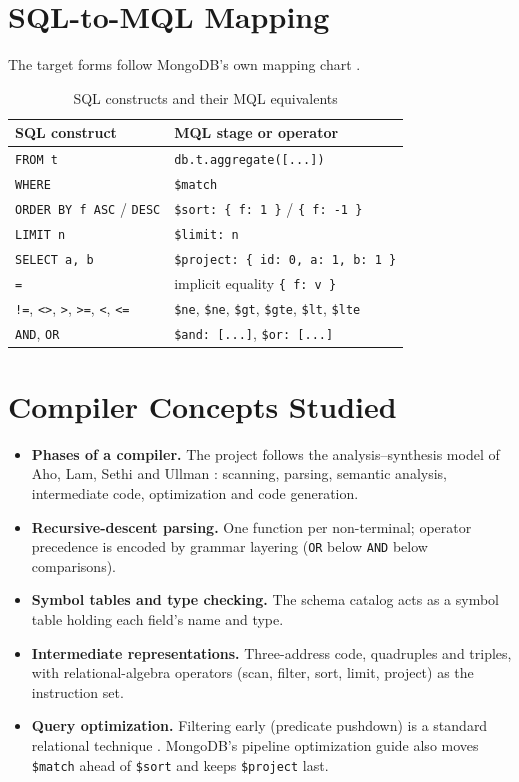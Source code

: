 \documentclass[12pt,a4paper]{report}
\newcommand{\codeus}{\textunderscore\allowbreak}
\DeclareRobustCommand{\code}[1]{\texttt{\let\_\codeus #1}}
\begin{document}
\section{SQL-to-MQL Mapping}
The target forms follow MongoDB's own mapping chart \cite{mongo-chart}.
\begin{table}[H]
\centering\small
\begin{tabular}{|l|l|}
\hline
\textbf{SQL construct} & \textbf{MQL stage or operator} \\ \hline
\code{FROM t} & \code{db.t.aggregate([...])} \\ \hline
\code{WHERE} & \code{\$match} \\ \hline
\code{ORDER BY f ASC} / \code{DESC} & \code{\$sort: \{ f: 1 \}} / \code{\{ f: -1 \}} \\ \hline
\code{LIMIT n} & \code{\$limit: n} \\ \hline
\code{SELECT a, b} & \code{\$project: \{ \_id: 0, a: 1, b: 1 \}} \\ \hline
\code{=} & implicit equality \code{\{ f: v \}} \\ \hline
\code{!=}, \code{<>}, \code{>}, \code{>=}, \code{<}, \code{<=} & \code{\$ne}, \code{\$ne}, \code{\$gt}, \code{\$gte}, \code{\$lt}, \code{\$lte} \\ \hline
\code{AND}, \code{OR} & \code{\$and: [...]}, \code{\$or: [...]} \\ \hline
\end{tabular}
\caption{SQL constructs and their MQL equivalents}
\end{table}

\section{Compiler Concepts Studied}
\begin{itemize}
  \item \textbf{Phases of a compiler.} The project follows the analysis--synthesis model of Aho, Lam, Sethi and Ullman \cite{aho}: scanning, parsing, semantic analysis, intermediate code, optimization and code generation.
  \item \textbf{Recursive-descent parsing.} One function per non-terminal; operator precedence is encoded by grammar layering (\code{OR} below \code{AND} below comparisons).
  \item \textbf{Symbol tables and type checking.} The schema catalog acts as a symbol table holding each field's name and type.
  \item \textbf{Intermediate representations.} Three-address code, quadruples and triples, with relational-algebra operators \cite{codd} (scan, filter, sort, limit, project) as the instruction set.
  \item \textbf{Query optimization.} Filtering early (predicate pushdown) is a standard relational technique \cite{selinger}. MongoDB's pipeline optimization guide \cite{mongo-opt} also moves \code{\$match} ahead of \code{\$sort} and keeps \code{\$project} last.
\end{itemize}
\end{document}
